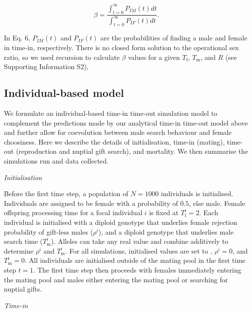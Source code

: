\documentclass[
]{article}
\begin{document}
\[\beta = \frac{\int_{t = 0}^{\infty} P_{IM}(t)dt}{\int_{t = 0}^{\infty} P_{IF}(t)dt}.
\tag{6}
\]

In Eq. 6, \(P_{IM}(t)\) and \(P_{IF}(t)\) are the probabilities of
finding a male and female in time-in, respectively. There is no closed
form solution to the operational sex ratio, so we used recursion to
calculate \(\beta\) values for a given \(T_{\mathrm{f}}\),
\(T_{\mathrm{m}}\), and \(R\) (see Supporting Information S2),

\hypertarget{individual-based-model}{%
\subsection{Individual-based model}\label{individual-based-model}}

We formulate an individual-based time-in time-out simulation model to
complement the predictions made by our analytical time-in time-out model
above and further allow for coevolution between male search behaviour
and female choosiness. Here we describe the details of initialisation,
time-in (mating), time-out (reproduction and nuptial gift search), and
mortality. We then summarise the simulations run and data collected.

\emph{Initialisation}

Before the first time step, a population of \(N = 1000\) individuals is
initialised. Individuals are assigned to be female with a probability of
\(0.5\), else male. Female offspring processing time for a focal
individual \(i\) is fixed at \(T^{i}_{\mathrm{f}} = 2\). Each individual
is initialised with a diploid genotype that underlies female rejection
probability of gift-less males (\(\rho^{i}\)), and a diploid genotype
that underlies male search time (\(T^{i}_{\mathrm{m}}\)). Alleles can
take any real value and combine additively to determine \(\rho^{i}\) and
\(T^{i}_{\mathrm{m}}\). For all simulations, initialised values are set
to , \(\rho^{i} = 0\), and \(T^{i}_{\mathrm{m}} = 0\). All individuals
are initialised outside of the mating pool in the first time step
\(t = 1\). The first time step then proceeds with females immediately
entering the mating pool and males either entering the mating pool or
searching for nuptial gifts.

\emph{Time-in}
\end{document}
